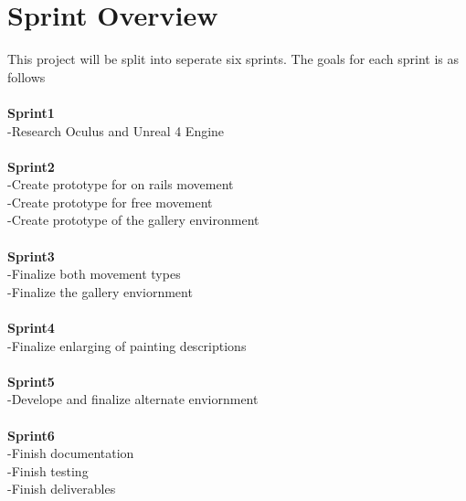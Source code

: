 \section{Sprint  Overview}
This project will be split into seperate six sprints. The goals for each sprint is as follows\\ \\
 \textbf{Sprint1}\\
-Research Oculus and Unreal 4 Engine\\ \\
 \textbf{Sprint2}\\
-Create prototype for on rails movement\\
-Create prototype for free movement\\
-Create prototype of the gallery environment\\ \\
 \textbf{Sprint3}\\
-Finalize both movement types\\
-Finalize the gallery enviornment\\ \\
 \textbf{Sprint4}\\
-Finalize enlarging of painting descriptions\\ \\
 \textbf{Sprint5}\\
-Develope and finalize alternate enviornment\\ \\
 \textbf{Sprint6}\\
-Finish documentation\\ 
-Finish testing\\
-Finish deliverables\\




